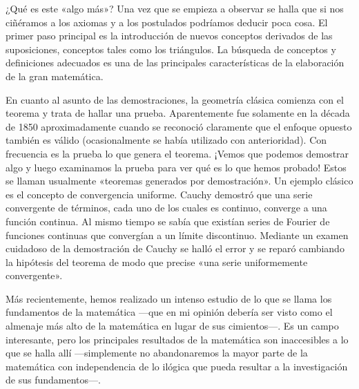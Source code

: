 \documentclass[a4paper, 12pt]{article}
\begin{document}
 

¿Qué es este «algo más»? Una vez que se empieza a observar se halla que si nos ciñéramos a los axiomas y a los postulados podríamos deducir poca cosa. El primer paso principal es la introducción de nuevos conceptos derivados de las suposiciones, conceptos tales como los triángulos. La búsqueda de conceptos y definiciones adecuados es una de las principales características de la elaboración de la gran matemática.

 

En cuanto al asunto de las demostraciones, la geometría clásica comienza con el teorema y trata de hallar una prueba. Aparentemente fue solamente en la década de 1850 aproximadamente cuando se reconoció claramente que el enfoque opuesto también es válido (ocasionalmente se había utilizado con anterioridad). Con frecuencia es la prueba lo que genera el teorema. ¡Vemos que podemos demostrar algo y luego examinamos la prueba para ver qué es lo que hemos probado! Estos se llaman usualmente «teoremas generados por demostración». Un ejemplo clásico es el concepto de convergencia uniforme. Cauchy demostró que una serie convergente de términos, cada uno de los cuales es continuo, converge a una función continua. Al mismo tiempo se sabía que existían series de Fourier de funciones continuas que convergían a un límite discontinuo. Mediante un examen cuidadoso de la demostración de Cauchy se halló el error y se reparó cambiando la hipótesis del teorema de modo que precise «una serie uniformemente convergente».

 

Más recientemente, hemos realizado un intenso estudio de lo que se llama los fundamentos de la matemática ---que en mi opinión debería ser visto como el almenaje más alto de la matemática en lugar de sus cimientos---. Es un campo interesante, pero los principales resultados de la matemática son inaccesibles a lo que se halla allí ---simplemente no abandonaremos la mayor parte de la matemática con independencia de lo ilógica que pueda resultar a la investigación de sus fundamentos---.

 
\end{document}
